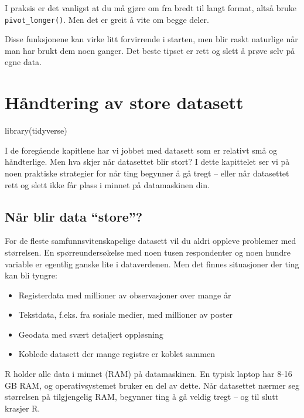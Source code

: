 \documentclass[
  norsk,
  letterpaper,
  DIV=11,
  numbers=noendperiod]{scrreprt}
\newenvironment{Shaded}{\begin{snugshade}}{\end{snugshade}}
\newcommand{\FunctionTok}[1]{\textcolor[rgb]{0.28,0.35,0.67}{#1}}
\newcommand{\NormalTok}[1]{\textcolor[rgb]{0.00,0.23,0.31}{#1}}
\providecommand{\tightlist}{%
  \setlength{\itemsep}{0pt}\setlength{\parskip}{0pt}}
\theoremstyle{definition}
\theoremstyle{remark}
\begin{document}
I praksis er det vanligst at du må gjøre om fra bredt til langt format,
altså bruke \texttt{pivot\_longer()}. Men det er greit å vite om begge
deler.

Disse funksjonene kan virke litt forvirrende i starten, men blir raskt
naturlige når man har brukt dem noen ganger. Det beste tipset er rett og
slett å prøve selv på egne data.

\chapter{Håndtering av store
datasett}\label{huxe5ndtering-av-store-datasett}

\begin{Shaded}
\begin{Highlighting}[]
\FunctionTok{library}\NormalTok{(tidyverse)}
\end{Highlighting}
\end{Shaded}

I de foregående kapitlene har vi jobbet med datasett som er relativt små
og håndterlige. Men hva skjer når datasettet blir stort? I dette
kapittelet ser vi på noen praktiske strategier for når ting begynner å
gå tregt -- eller når datasettet rett og slett ikke får plass i minnet
på datamaskinen din.

\section{Når blir data ``store''?}\label{nuxe5r-blir-data-store}

For de fleste samfunnsvitenskapelige datasett vil du aldri oppleve
problemer med størrelsen. En spørreundersøkelse med noen tusen
respondenter og noen hundre variable er egentlig ganske lite i
dataverdenen. Men det finnes situasjoner der ting kan bli tyngre:

\begin{itemize}
\tightlist
\item
  Registerdata med millioner av observasjoner over mange år
\item
  Tekstdata, f.eks. fra sosiale medier, med millioner av poster
\item
  Geodata med svært detaljert oppløsning
\item
  Koblede datasett der mange registre er koblet sammen
\end{itemize}

R holder alle data i minnet (RAM) på datamaskinen. En typisk laptop har
8-16 GB RAM, og operativsystemet bruker en del av dette. Når datasettet
nærmer seg størrelsen på tilgjengelig RAM, begynner ting å gå veldig
tregt -- og til slutt krasjer R.
\end{document}
